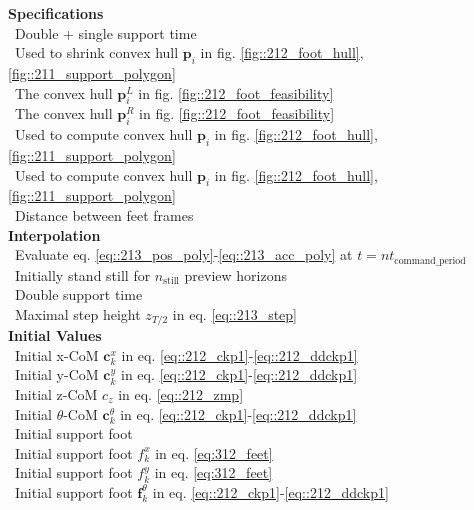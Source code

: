 \begin{minipage}[t]{1.\textwidth}
	\begin{minipage}{0.5\textwidth}
		\scriptsize{
			\hfill \textbf{Specifications}\\
			\mbox{}~\hfill Double + single support time\\
			\mbox{}~\hfill Used to shrink convex hull $\bm{p}_i$ in fig.  \ref{fig::212_foot_hull}, \ref{fig::211_support_polygon}\\
			\mbox{}~\hfill The convex hull $\bm{p}^L_i$ in fig. \ref{fig::212_foot_feasibility}\\
			\mbox{}~\hfill The convex hull $\bm{p}^R_i$ in fig. \ref{fig::212_foot_feasibility}\\
			\mbox{}~\hfill Used to compute convex hull $\bm{p}_i$ in fig.  \ref{fig::212_foot_hull}, \ref{fig::211_support_polygon}\\
			\mbox{}~\hfill Used to compute convex hull $\bm{p}_i$ in fig.  \ref{fig::212_foot_hull}, \ref{fig::211_support_polygon}\\
			\mbox{}~\hfill Distance between feet frames\\
			
			\hfill \textbf{Interpolation}\\
			\mbox{}~\hfill Evaluate eq. \ref{eq::213_pos_poly}-\ref{eq::213_acc_poly} at $t=nt_\text{command\_period}$\\
			\mbox{}~\hfill Initially stand still for $n_\text{still}$ preview horizons\\
			\mbox{}~\hfill Double support time\\
			\mbox{}~\hfill Maximal step height $z_{T/2}$ in eq. \ref{eq::213_step}\\
			
			\hfill \textbf{Initial Values}\\
			\mbox{}~\hfill Initial x-CoM $\bm{c}_k^x$ in eq. \ref{eq::212_ckp1}-\ref{eq::212_ddckp1}\\
			\mbox{}~\hfill Initial y-CoM $\bm{c}_k^y$ in eq. \ref{eq::212_ckp1}-\ref{eq::212_ddckp1}\\
			\mbox{}~\hfill Initial z-CoM $c_z$ in eq. \ref{eq::212_zmp}\\
			\mbox{}~\hfill Initial $\theta$-CoM $\bm{c}_k^\theta$ in eq. \ref{eq::212_ckp1}-\ref{eq::212_ddckp1}\\
			\mbox{}~\hfill Initial support foot\\
			\mbox{}~\hfill Initial support foot $f_k^x$ in eq. \ref{eq:312_feet}\\
			\mbox{}~\hfill Initial support foot $f_k^y$ in eq. \ref{eq:312_feet}\\
			\mbox{}~\hfill Initial support foot $\bm{f}_k^\theta$ in eq. \ref{eq::212_ckp1}-\ref{eq::212_ddckp1}\\
			
}
\end{minipage}
\end{minipage}
